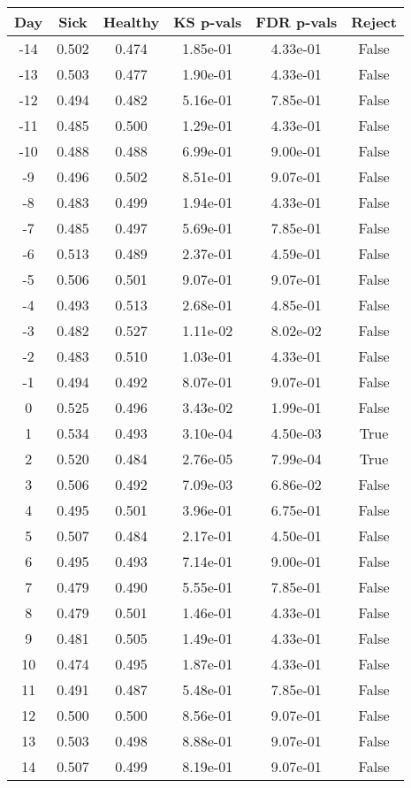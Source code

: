 \begin{tabular}{c|c|c|c|c|c}
Day &  Sick & Healthy &  KS p-vals & FDR p-vals & Reject\\
\hline
-14 & 0.502 &   0.474 &   1.85e-01 &   4.33e-01 &  False\\
-13 & 0.503 &   0.477 &   1.90e-01 &   4.33e-01 &  False\\
-12 & 0.494 &   0.482 &   5.16e-01 &   7.85e-01 &  False\\
-11 & 0.485 &   0.500 &   1.29e-01 &   4.33e-01 &  False\\
-10 & 0.488 &   0.488 &   6.99e-01 &   9.00e-01 &  False\\
 -9 & 0.496 &   0.502 &   8.51e-01 &   9.07e-01 &  False\\
 -8 & 0.483 &   0.499 &   1.94e-01 &   4.33e-01 &  False\\
 -7 & 0.485 &   0.497 &   5.69e-01 &   7.85e-01 &  False\\
 -6 & 0.513 &   0.489 &   2.37e-01 &   4.59e-01 &  False\\
 -5 & 0.506 &   0.501 &   9.07e-01 &   9.07e-01 &  False\\
 -4 & 0.493 &   0.513 &   2.68e-01 &   4.85e-01 &  False\\
 -3 & 0.482 &   0.527 &   1.11e-02 &   8.02e-02 &  False\\
 -2 & 0.483 &   0.510 &   1.03e-01 &   4.33e-01 &  False\\
 -1 & 0.494 &   0.492 &   8.07e-01 &   9.07e-01 &  False\\
  0 & 0.525 &   0.496 &   3.43e-02 &   1.99e-01 &  False\\
  1 & 0.534 &   0.493 &   3.10e-04 &   4.50e-03 &   True\\
  2 & 0.520 &   0.484 &   2.76e-05 &   7.99e-04 &   True\\
  3 & 0.506 &   0.492 &   7.09e-03 &   6.86e-02 &  False\\
  4 & 0.495 &   0.501 &   3.96e-01 &   6.75e-01 &  False\\
  5 & 0.507 &   0.484 &   2.17e-01 &   4.50e-01 &  False\\
  6 & 0.495 &   0.493 &   7.14e-01 &   9.00e-01 &  False\\
  7 & 0.479 &   0.490 &   5.55e-01 &   7.85e-01 &  False\\
  8 & 0.479 &   0.501 &   1.46e-01 &   4.33e-01 &  False\\
  9 & 0.481 &   0.505 &   1.49e-01 &   4.33e-01 &  False\\
 10 & 0.474 &   0.495 &   1.87e-01 &   4.33e-01 &  False\\
 11 & 0.491 &   0.487 &   5.48e-01 &   7.85e-01 &  False\\
 12 & 0.500 &   0.500 &   8.56e-01 &   9.07e-01 &  False\\
 13 & 0.503 &   0.498 &   8.88e-01 &   9.07e-01 &  False\\
 14 & 0.507 &   0.499 &   8.19e-01 &   9.07e-01 &  False\\
\end{tabular}